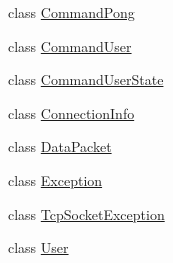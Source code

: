 \begin{DoxyCompactItemize}
\item 
class \mbox{\hyperlink{classbabel_1_1common_1_1_command_pong}{Command\+Pong}}
\item 
class \mbox{\hyperlink{classbabel_1_1common_1_1_command_user}{Command\+User}}
\item 
class \mbox{\hyperlink{classbabel_1_1common_1_1_command_user_state}{Command\+User\+State}}
\item 
class \mbox{\hyperlink{classbabel_1_1common_1_1_connection_info}{Connection\+Info}}
\item 
class \mbox{\hyperlink{classbabel_1_1common_1_1_data_packet}{Data\+Packet}}
\item 
class \mbox{\hyperlink{classbabel_1_1common_1_1_exception}{Exception}}
\item 
class \mbox{\hyperlink{classbabel_1_1common_1_1_tcp_socket_exception}{Tcp\+Socket\+Exception}}
\item 
class \mbox{\hyperlink{classbabel_1_1common_1_1_user}{User}}
\end{DoxyCompactItemize}
